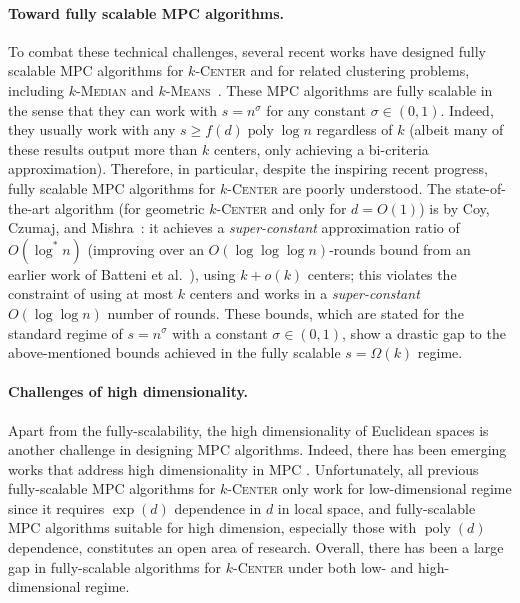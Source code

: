 \documentclass[11pt,letterpaper]{article}
\theoremstyle{plain}
\theoremstyle{definition}
\theoremstyle{remark}
\newcommand{\ProblemName}[1]{\textsc{#1}}
\newcommand{\kCenter}{$k$-\ProblemName{Center}\xspace}
\newcommand{\kMedian}{$k$-\ProblemName{Median}\xspace}
\newcommand{\kMeans}{$k$-\ProblemName{Means}\xspace}
\DeclareMathOperator{\poly}{poly}
\begin{document}
\paragraph{Toward fully scalable MPC algorithms.}
To combat these technical challenges, several recent works have designed fully scalable MPC algorithms for \kCenter and for related clustering problems, including \kMedian and \kMeans~\cite{BhaskaraW18,BEFM21,Cohen-AddadLNSS21,Cohen-AddadMZ22,CCM23,CGJKV24}. These MPC algorithms are fully scalable in the sense that they can work with $s = n^{\sigma}$ for any constant $\sigma\in (0,1)$. Indeed, they usually work with any $s \geq f(d) \poly\log n$ regardless of $k$ (albeit many of these results output more than $k$ centers, only achieving a bi-criteria approximation).
Therefore, in particular, despite the inspiring recent progress, fully scalable MPC algorithms for \kCenter are poorly understood.
The state-of-the-art algorithm (for geometric \kCenter and only for $d=O(1)$) is by Coy, Czumaj, and Mishra~\cite{CCM23}:
it achieves a \emph{super-constant} approximation ratio of $O(\log^* n)$ (improving over an $O(\log\log\log n)$-rounds bound from an earlier work of Batteni et al.\ \cite{BEFM21}),
using $k + o(k)$ centers; this violates the constraint of using at most $k$ centers and works in a \emph{super-constant} $O(\log\log n)$ number of rounds.
These bounds, which are stated for the standard regime of $s = n^\sigma$ with a constant $\sigma\in (0,1)$, show a drastic gap to the above-mentioned bounds achieved in the fully scalable $s = \Omega(k)$ regime.

\paragraph{Challenges of high dimensionality.}
Apart from the fully-scalability,
the high dimensionality of Euclidean spaces is another challenge in designing MPC algorithms.
Indeed, there has been emerging works that address high dimensionality in MPC
\cite{BhaskaraW18,Cohen-AddadLNSS21,Cohen-AddadMZ22,EpastoMMZ22,CGJKV24,JayaramMNZ24,AzarmehrBJLMZ25}.
Unfortunately, all previous fully-scalable MPC algorithms for \kCenter only work for low-dimensional regime since it requires $\exp(d)$ dependence in $d$ in local space,
and fully-scalable MPC algorithms suitable for high dimension, especially those with $\poly(d)$ dependence, constitutes an open area of research.
Overall, there has been a large gap in fully-scalable algorithms for \kCenter
under both low- and high-dimensional regime.
\end{document}
